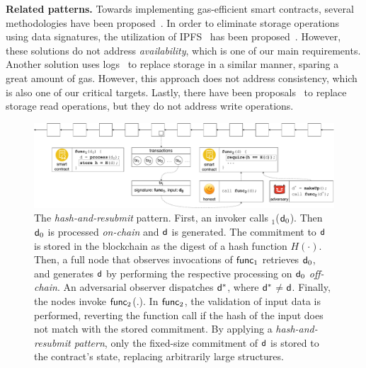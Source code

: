 \noindent \textbf{Related patterns.} Towards implementing gas-efficient smart
contracts, several
methodologies have been proposed~\cite{contract-opt-1,contract-opt-2,slither,madmax}.
In order to eliminate storage operations
using data signatures, the utilization of IPFS~\cite{ipfs} has been
proposed~\cite{ipfs-1,ipfs-2}. However, these solutions do not address
\emph{availability}, which is one of our main requirements. Another solution
uses logs~\cite{logs} to replace storage in a similar manner, sparing a great
amount of gas. However, this approach does not address consistency, which is
also one of our critical targets. Lastly, there have been proposals~\cite{memory-array}
to replace storage read operations, but they do not address write operations.

\begin{landscape}\centering
\vspace*{\fill}
\begin{figure}
    \centering
    \includegraphics[width=\linewidth]{figures/har-pattern.pdf}

    \caption{The \emph{hash-and-resubmit} pattern. First, an invoker calls
        \proc$_1$($\mathsf{d}_0$). Then $\mathsf{d}_0$ is processed \emph{on-chain} and
        $\mathsf{d}$ is generated. The commitment to $\mathsf{d}$ is stored in the
        blockchain as the digest of a hash function $H(\cdot)$. Then,
        a full node that observes invocations of $\textsf{func}_1$ retrieves $\mathsf{d}_0$,
        and generates $\mathsf{d}$ by performing the respective processing on
        $\mathsf{d}_0$ \emph{off-chain}. An adversarial observer dispatches
        $\mathsf{d^*}$, where $\mathsf{d^*}$$\neq$$\mathsf{d}$. Finally, the nodes invoke
        $\textsf{func}_2$(.). In $\textsf{func}_2$, the validation of input data is performed,
        reverting the function call if the hash of the input does not
        match with the stored commitment. By applying
        a \emph{hash-and-resubmit pattern}, only the fixed-size commitment of
        $\mathsf{d}$ is stored to the contract's state, replacing arbitrarily large
        structures.}

        \label{fig:har-pattern}
\end{figure}
\vfill
\end{landscape}

